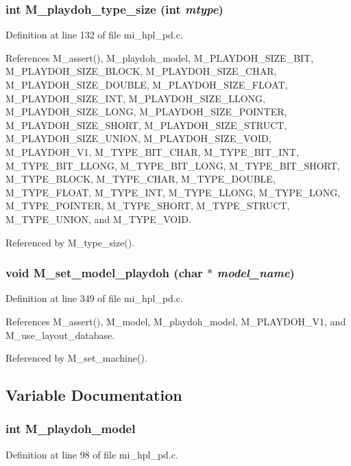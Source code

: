 \subsubsection{\setlength{\rightskip}{0pt plus 5cm}int M\_\-playdoh\_\-type\_\-size (int {\em mtype})}\label{mi__hpl__pd_8c_f0fe265795e37bc572ebd83a2c7be457}




Definition at line 132 of file mi\_\-hpl\_\-pd.c.

References M\_\-assert(), M\_\-playdoh\_\-model, M\_\-PLAYDOH\_\-SIZE\_\-BIT, M\_\-PLAYDOH\_\-SIZE\_\-BLOCK, M\_\-PLAYDOH\_\-SIZE\_\-CHAR, M\_\-PLAYDOH\_\-SIZE\_\-DOUBLE, M\_\-PLAYDOH\_\-SIZE\_\-FLOAT, M\_\-PLAYDOH\_\-SIZE\_\-INT, M\_\-PLAYDOH\_\-SIZE\_\-LLONG, M\_\-PLAYDOH\_\-SIZE\_\-LONG, M\_\-PLAYDOH\_\-SIZE\_\-POINTER, M\_\-PLAYDOH\_\-SIZE\_\-SHORT, M\_\-PLAYDOH\_\-SIZE\_\-STRUCT, M\_\-PLAYDOH\_\-SIZE\_\-UNION, M\_\-PLAYDOH\_\-SIZE\_\-VOID, M\_\-PLAYDOH\_\-V1, M\_\-TYPE\_\-BIT\_\-CHAR, M\_\-TYPE\_\-BIT\_\-INT, M\_\-TYPE\_\-BIT\_\-LLONG, M\_\-TYPE\_\-BIT\_\-LONG, M\_\-TYPE\_\-BIT\_\-SHORT, M\_\-TYPE\_\-BLOCK, M\_\-TYPE\_\-CHAR, M\_\-TYPE\_\-DOUBLE, M\_\-TYPE\_\-FLOAT, M\_\-TYPE\_\-INT, M\_\-TYPE\_\-LLONG, M\_\-TYPE\_\-LONG, M\_\-TYPE\_\-POINTER, M\_\-TYPE\_\-SHORT, M\_\-TYPE\_\-STRUCT, M\_\-TYPE\_\-UNION, and M\_\-TYPE\_\-VOID.

Referenced by M\_\-type\_\-size().
\subsubsection{\setlength{\rightskip}{0pt plus 5cm}void M\_\-set\_\-model\_\-playdoh (char $\ast$ {\em model\_\-name})}\label{mi__hpl__pd_8c_148b5388a5ee7899bd11ad24d8648595}




Definition at line 349 of file mi\_\-hpl\_\-pd.c.

References M\_\-assert(), M\_\-model, M\_\-playdoh\_\-model, M\_\-PLAYDOH\_\-V1, and M\_\-use\_\-layout\_\-database.

Referenced by M\_\-set\_\-machine().

\subsection{Variable Documentation}
\subsubsection{\setlength{\rightskip}{0pt plus 5cm}int \bf{M\_\-playdoh\_\-model}}\label{mi__hpl__pd_8c_bed36a6b8524426f321bd8de6c12bdb9}




Definition at line 98 of file mi\_\-hpl\_\-pd.c.